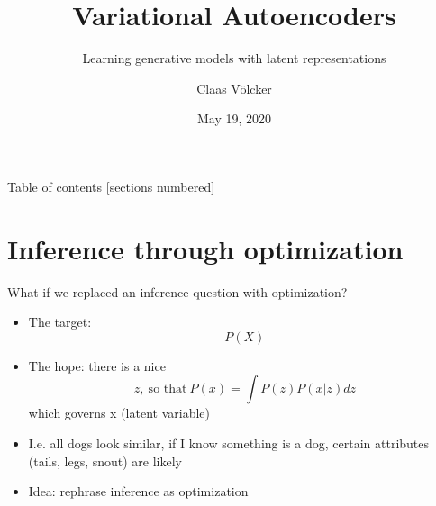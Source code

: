 \documentclass[10pt,aspectratio=169,handout]{beamer}
\title{Variational Autoencoders}
\subtitle{Learning generative models with latent representations}
\date{May 19, 2020}
\author{Claas Völcker}
\institute{Deep Generative Models - SoSe 2020}
\begin{document}

\maketitle


\begin{frame}{Table of contents}
[sections numbered]
\tableofcontents[hideallsubsections]
\end{frame}


\section{Inference through optimization}

\begin{frame}{What if we replaced an inference question with optimization?}
    \begin{itemize}[<+->]
        \item The target: $$P(X)$$
        \item The hope: there is a nice $$z,~\text{so that}~P(x) = \int P(z)P(x|z)dz$$ which governs x (latent variable)
        \item I.e. all dogs look similar, if I know something is a dog, certain attributes (tails, legs, snout) are likely
        \item Idea: rephrase inference as optimization
    \end{itemize}
\end{frame}

\end{document}
